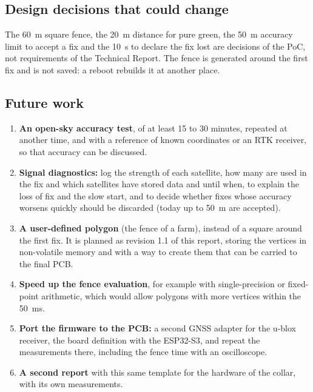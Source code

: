 \subsection{Design decisions that could change}

The 60~m square fence, the 20~m distance for pure green, the 50~m accuracy limit to accept a fix and the 10~s
to declare the fix lost are decisions of the PoC, not requirements of the Technical Report. The fence is
generated around the first fix and is not saved: a reboot rebuilds it at another place.

\subsection{Future work}

\begin{enumerate}
  \item \textbf{An open-sky accuracy test}, of at least 15 to 30 minutes, repeated at another time, and with a
        reference of known coordinates or an RTK receiver, so that accuracy can be discussed.
  \item \textbf{Signal diagnostics:} log the strength of each satellite, how many are used in the fix and which
        satellites have stored data and until when, to explain the loss of fix and the slow start, and to decide whether fixes whose accuracy worsens quickly
        should be discarded (today up to 50~m are accepted).
  \item \textbf{A user-defined polygon} (the fence of a farm), instead of a square around the first fix. It is
        planned as revision 1.1 of this report, storing the vertices in non-volatile memory and with a way to
        create them that can be carried to the final PCB.
  \item \textbf{Speed up the fence evaluation}, for example with single-precision or fixed-point arithmetic,
        which would allow polygons with more vertices within the 50~ms.
  \item \textbf{Port the firmware to the PCB:} a second GNSS adapter for the u-blox receiver, the board
        definition with the ESP32-S3, and repeat the measurements there, including the fence time with an
        oscilloscope.
  \item \textbf{A second report} with this same template for the hardware of the collar, with its own
        measurements.
\end{enumerate}
